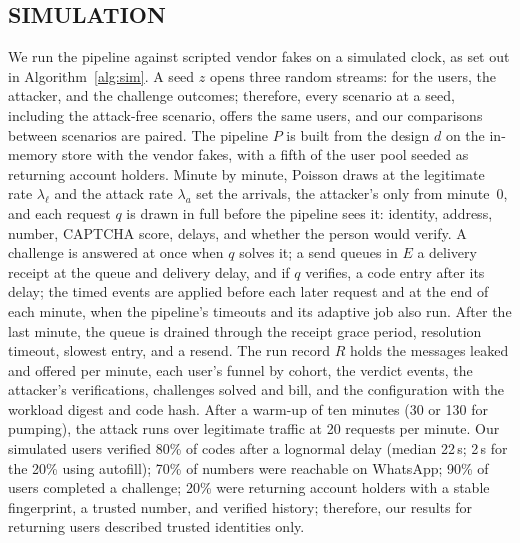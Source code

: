 \documentclass{IEEEoj}
\begin{document}
\subsection{SIMULATION}
\label{sec:sim}
We run the pipeline against scripted vendor fakes on a simulated clock, as set out in Algorithm~\ref{alg:sim}. A seed $z$ opens three random streams: for the users, the attacker, and the challenge outcomes; therefore, every scenario at a seed, including the attack-free scenario, offers the same users, and our comparisons between scenarios are paired. The pipeline $P$ is built from the design $d$ on the in-memory store with the vendor fakes, with a fifth of the user pool seeded as returning account holders. Minute by minute, Poisson draws at the legitimate rate $\lambda_\ell$ and the attack rate $\lambda_a$ set the arrivals, the attacker's only from minute~0, and each request $q$ is drawn in full before the pipeline sees it: identity, address, number, CAPTCHA score, delays, and whether the person would verify. A challenge is answered at once when $q$ solves it; a send queues in $E$ a delivery receipt at the queue and delivery delay, and if $q$ verifies, a code entry after its delay; the timed events are applied before each later request and at the end of each minute, when the pipeline's timeouts and its adaptive job also run. After the last minute, the queue is drained through the receipt grace period, resolution timeout, slowest entry, and a resend. The run record $R$ holds the messages leaked and offered per minute, each user's funnel by cohort, the verdict events, the attacker's verifications, challenges solved and bill, and the configuration with the workload digest and code hash. After a warm-up of ten minutes (30 or 130 for pumping), the attack runs over legitimate traffic at 20 requests per minute. Our simulated users verified 80\% of codes after a lognormal delay (median 22\,s; 2\,s for the 20\% using autofill); 70\% of numbers were reachable on WhatsApp; 90\% of users completed a challenge; 20\% were returning account holders with a stable fingerprint, a trusted number, and verified history; therefore, our results for returning users described trusted identities only.

\begin{algorithm}[!htb]
\caption{One simulation run.}
\label{alg:sim}
\footnotesize\raggedright

\end{algorithm}
\end{document}
